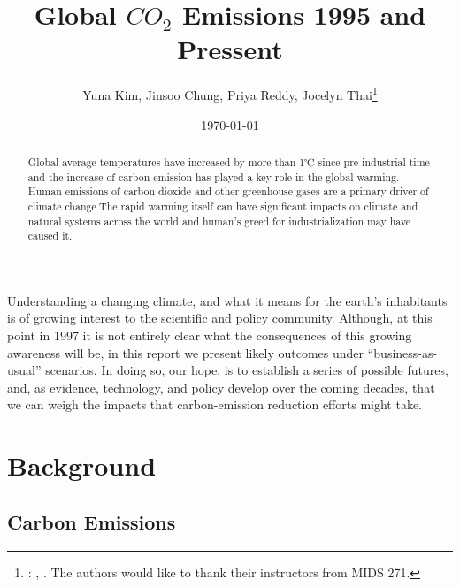\documentclass[AER]{AEA}
\begin{document}
\title{Global \(CO_{2}\) Emissions 1995 and Pressent}


\author{
  Yuna Kim, Jinsoo Chung, Priya Reddy, Jocelyn Thai\thanks{
  : , \href{mailto:}{}.
  The authors would like to thank their instructors from MIDS 271.
}
}

\date{\today}
\JEL{}

\begin{abstract}
Global average temperatures have increased by more than 1℃ since
pre-industrial time and the increase of carbon emission has played a key
role in the global warming. Human emissions of carbon dioxide and other
greenhouse gases are a primary driver of climate change.The rapid
warming itself can have significant impacts on climate and natural
systems across the world and human's greed for industrialization may
have caused it.
\end{abstract}


\maketitle

Understanding a changing climate, and what it means for the earth's
inhabitants is of growing interest to the scientific and policy
community. Although, at this point in 1997 it is not entirely clear what
the consequences of this growing awareness will be, in this report we
present likely outcomes under ``business-as-usual'' scenarios. In doing
so, our hope, is to establish a series of possible futures, and, as
evidence, technology, and policy develop over the coming decades, that
we can weigh the impacts that carbon-emission reduction efforts might
take.

\hypertarget{background}{%
\section{Background}\label{background}}

\hypertarget{carbon-emissions}{%
\subsection{Carbon Emissions}\label{carbon-emissions}}
\end{document}
